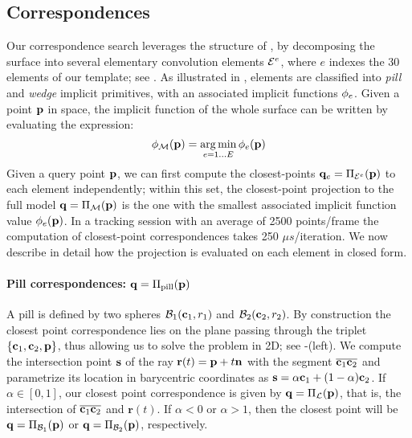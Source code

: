 \label{sec:model} %

\subsection{Correspondences}
\label{sec:corresp}
Our correspondence search leverages the structure of , by decomposing the surface into several elementary convolution elements $\mathcal{E}^e$, where $e$ indexes the 30 elements of our template; see \VideoElements{}. As illustrated in , elements are classified into 
\emph{pill} and \emph{wedge} implicit primitives, with an associated implicit functions $\phi_e$.
Given a point $\mathbf{p}$ in space, the implicit function of the whole surface can be written by evaluating the expression:
\begin{equation}
\phi_{\mathcal{M}}(\mathbf{p}) = \operatorname*{arg\,min}_{e=1 \dots E} \phi_e(\mathbf{p})
\label{eq:piecewise}
\end{equation}
%
Given a query point $\mathbf{p}$, we can first compute the closest-points $\mathbf{q}_e = \Pi_{\mathcal{E}^e}(\mathbf{p})$ to each element independently; within this set, the closest-point projection to the full model $\mathbf{q} = \Pi_{\mathcal{M}}(\mathbf{p})$ is the one with the smallest associated implicit function value $\phi_e(\mathbf{p})$. In a tracking session with an average of 2500 points/frame the computation of closest-point correspondences takes 250 $\mu s$/iteration. 
%
We now describe in detail how the projection is evaluated on each element in closed form. 


\paragraph{Pill correspondences: $\mathbf{q}=\Pi_\text{pill}(\mathbf{p})$}
A pill is defined by two spheres $\mathcal{B}_1(\mathbf{c}_1,r_1)$ and $\mathcal{B}_2(\mathbf{c}_2,r_2)$. By construction the closest point correspondence lies on the plane passing through the triplet $\{ \mathbf{c}_1, \mathbf{c}_2, \mathbf{p} \}$, thus allowing us to solve the problem in 2D; see -(left). 
% 
We compute the intersection point $\mathbf{s}$ of the ray $\mathbf{r}(t) = \mathbf{p} + t\mathbf{n}$ with the segment $\overline{\mathbf{c}_1 \mathbf{c}_2}$ and parametrize its location in barycentric coordinates as $\mathbf{s} = \alpha\mathbf{c}_1 + (1-\alpha)\mathbf{c}_2$. If $\alpha \in [0,1]$, our closest point correspondence is given by $\mathbf{q}=\Pi_\mathcal{L}(\mathbf{p})$, that is, the intersection of $\overline{\mathbf{c}_1 \mathbf{c}_2}$ and $\mathbf{r}(t)$.  If $\alpha<0$ or $\alpha>1$, then the closest point will be $\mathbf{q}=\Pi_{\mathcal{B}_1}(\mathbf{p})$ or $\mathbf{q}=\Pi_{\mathcal{B}_2}(\mathbf{p})$, respectively. 

